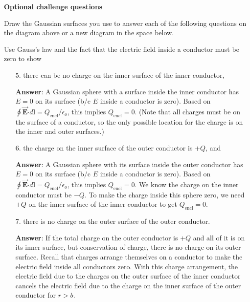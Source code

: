 \documentclass{article}
\newcommand{\bfvec}[1]{\vec{\mathbf{#1}}}
\newcommand{\bfcdot}[0]{\boldsymbol{\cdot}}
\begin{document}
\newpage

\textbf{Optional challenge questions}



Draw the Gaussian surfaces you use to answer each of the following questions on the diagram above or a new diagram in the space below.

Use Gauss's law and the fact that the electric field inside a conductor must be zero to show

\begin{enumerate}

  \item[5.] there can be no charge on the inner surface of the inner conductor,

            \ifsolutions
            \textbf{Answer}: A Gaussian sphere with a surface inside the inner conductor has $E=0$ on its surface (b/c $E$ inside a conductor is zero). Based on $\oint \bfvec{E}\bfcdot d\mathbf{l}=Q_{\text{encl}}/\epsilon_o$, this implies $Q_{\text{encl}}=0$. (Note that all charges must be on the surface of a conductor, so the only possible location for the charge is on the inner and outer surfaces.)
            \else
            \vskip 120pt
            \fi

  \item[6.] the charge on the inner surface of the outer conductor is $+Q$, and

            \ifsolutions
            \textbf{Answer}: A Gaussian sphere with its surface inside the outer conductor has $E=0$ on its surface (b/c $E$ inside a conductor is zero). Based on $\oint \bfvec{E}\bfcdot d\mathbf{l}=Q_{\text{encl}}/\epsilon_o$, this implies $Q_{\text{encl}}=0$. We know the charge on the inner conductor must be $-Q$. To make the charge inside this sphere zero, we need $+Q$ on the inner surface of the inner conductor to get $Q_{\text{encl}}=0$.
            \else
            \vskip 120pt
            \fi

  \item[7.] there is no charge on the outer surface of the outer conductor.

            \ifsolutions
            \textbf{Answer}: If the total charge on the outer conductor is $+Q$ and all of it is on its inner surface, but conservation of charge, there is no charge on its outer surface. Recall that charges arrange themselves on a conductor to make the electric field inside all conductors zero. With this charge arrangement, the electric field due to the charges on the outer surface of the inner conductor cancels the electric field due to the charge on the inner surface of the outer conductor for $r>b$.
            \else

            \fi

\end{enumerate}
\end{document}

